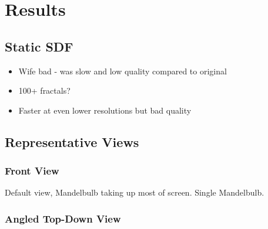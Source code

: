 \chapter{Results}
\label{chapter4}

\section{Static SDF}

\begin{itemize}
	\item Wife bad - was slow and low quality compared to original
	\item 100+ fractals?
	\item Faster at even lower resolutions but bad quality
\end{itemize}

\section{Representative Views}

\subsection{Front View}

Default view, Mandelbulb taking up most of screen. Single Mandelbulb.

\subsection{Angled Top-Down View}
